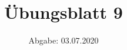 

\subject{Computational Physics}
\title{Übungsblatt 9}
\date{%
  Abgabe: 03.07.2020
}



\maketitle
\thispagestyle{empty}
\newpage



%
%



